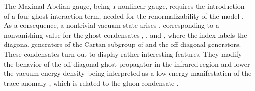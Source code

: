 \documentclass[a4paper,12pt]{article}
\begin{document}
The Maximal Abelian gauge, being a nonlinear gauge, requires the
introduction of a four ghost interaction term, needed for the
renormalizability of the model \cite{mlp,f}. As a consequence, a nontrivial
vacuum state arises \cite{ms,k,sp,dd}, corresponding to a nonvanishing value
for the ghost condensates \coordHE{}, \coordHE{}, \coordHE{} and \coordHE{}, where the index \coordHE{} labels
the \coordHE{} diagonal generators of the Cartan subgroup of \coordHE{} and \myHighlight{$%
\alpha ,\beta $}\coordHE{} the \coordHE{} off-diagonal generators. These condensates turn
out to display rather interesting features. They modify the behavior of the
off-diagonal ghost propagator in the infrared region \cite{ms,k,sp} and
lower the vacuum energy density, being interpreted as a low-energy
manifestation of the trace anomaly \coordHE{}, which is related to the gluon condensate \coordHE{}.
\end{document}
